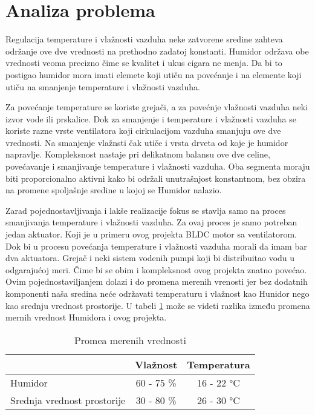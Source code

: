 \documentclass[a4paper, 12pt]{article}
\begin{document}
\section{Analiza problema}

Regulacija temperature i vlažnosti vazduha neke zatvorene sredine zahteva održanje ove dve vrednosti na prethodno zadatoj konstanti. Humidor održava obe vrednosti veoma precizno čime se kvalitet i ukus cigara ne menja. Da bi to postigao humidor mora imati elemete koji utiču na povećanje i na elemente koji utiču na smanjenje temperature i vlažnosti vazduha. 

\vspace{10pt}

Za povećanje temperature se koriste grejači, a za povećnje vlažnosti vazduha neki izvor vode ili prskalice. Dok za smanjenje i temperature i vlažnosti vazduha se koriste razne vrste ventilatora koji cirkulacijom vazduha smanjuju ove dve vrednosti. Na smanjenje vlažnsti čak utiče i vrsta drveta od koje je humidor napravlje. Kompleksnost nastaje pri delikatnom balansu ove dve celine, povećavanje i smanjivanje temperature i vlažnosti vazduha. Oba segmenta moraju biti proporcionalno aktivni kako bi održali unutrašnjost konstantnom, bez obzira na promene spoljašnje sredine u kojoj se Humidor nalazio.

\vspace{10pt}

\sloppypar
Zarad pojednostavljivanja i lakše realizacije fokus se stavlja samo na proces smanjivanja temperature i vlažnosti vazduha. Za ovaj proces je samo potreban jedan aktuator. Koji je u primeru ovog projekta BLDC motor sa ventilatorom. Dok bi u procesu povećanja temperature i vlažnosti vazduha morali da imam bar dva aktuatora. Grejač i neki sistem vodenih pumpi koji bi distribuitao vodu u odgarajućoj meri. Čime bi se obim i kompleksnost ovog projekta znatno povećao. Ovim pojednostaviljanjem dolazi i do promena merenih vrenosti jer bez dodatnih komponenti naša sredina neće održavati temperaturu i vlažnost kao Hunidor nego kao srednju vrednost prostorije. U tabeli \ref{tab:merne-vrednosti} može se videti razlika između promena mernih vrednost Humidora i ovog projekta.

\vspace{10pt}

\begin{table}[H]
\centering
\begin{tabular}{|l|c|c|}
\hline
& Vlažnost & Temperatura\\
\hline
Humidor & 60 - 75 \% & 16 - 22 °C\\
\hline
Srednja vrednost prostorije & 30 - 80 \% & 26 - 30 °C\\
\hline
\end{tabular}
\caption{Promea merenih vrednosti} \label{tab:merne-vrednosti}
\end{table}
\end{document}
